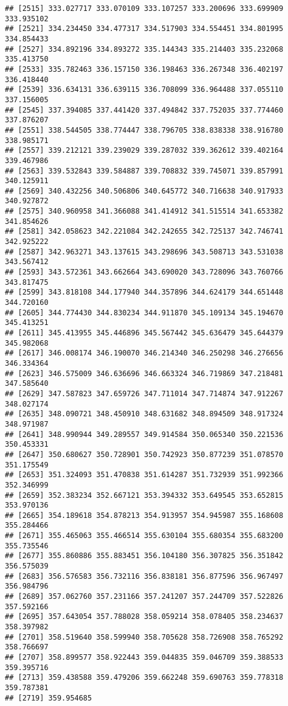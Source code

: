 \documentclass[]{article}
\begin{document}
\begin{verbatim}
## [2515] 333.027717 333.070109 333.107257 333.200696 333.699909 333.935102
## [2521] 334.234450 334.477317 334.517903 334.554451 334.801995 334.854433
## [2527] 334.892196 334.893272 335.144343 335.214403 335.232068 335.413750
## [2533] 335.782463 336.157150 336.198463 336.267348 336.402197 336.418440
## [2539] 336.634131 336.639115 336.708099 336.964488 337.055110 337.156005
## [2545] 337.394085 337.441420 337.494842 337.752035 337.774460 337.876207
## [2551] 338.544505 338.774447 338.796705 338.838338 338.916780 338.985171
## [2557] 339.212121 339.239029 339.287032 339.362612 339.402164 339.467986
## [2563] 339.532843 339.584887 339.708832 339.745071 339.857991 340.125911
## [2569] 340.432256 340.506806 340.645772 340.716638 340.917933 340.927872
## [2575] 340.960958 341.366088 341.414912 341.515514 341.653382 341.854626
## [2581] 342.058623 342.221084 342.242655 342.725137 342.746741 342.925222
## [2587] 342.963271 343.137615 343.298696 343.508713 343.531038 343.567412
## [2593] 343.572361 343.662664 343.690020 343.728096 343.760766 343.817475
## [2599] 343.818108 344.177940 344.357896 344.624179 344.651448 344.720160
## [2605] 344.774430 344.830234 344.911870 345.109134 345.194670 345.413251
## [2611] 345.413955 345.446896 345.567442 345.636479 345.644379 345.982068
## [2617] 346.008174 346.190070 346.214340 346.250298 346.276656 346.334364
## [2623] 346.575009 346.636696 346.663324 346.719869 347.218481 347.585640
## [2629] 347.587823 347.659726 347.711014 347.714874 347.912267 348.027174
## [2635] 348.090721 348.450910 348.631682 348.894509 348.917324 348.971987
## [2641] 348.990944 349.289557 349.914584 350.065340 350.221536 350.453331
## [2647] 350.680627 350.728901 350.742923 350.877239 351.078570 351.175549
## [2653] 351.324093 351.470838 351.614287 351.732939 351.992366 352.346999
## [2659] 352.383234 352.667121 353.394332 353.649545 353.652815 353.970136
## [2665] 354.189618 354.878213 354.913957 354.945987 355.168608 355.284466
## [2671] 355.465063 355.466514 355.630104 355.680354 355.683200 355.735546
## [2677] 355.860886 355.883451 356.104180 356.307825 356.351842 356.575039
## [2683] 356.576583 356.732116 356.838181 356.877596 356.967497 356.984796
## [2689] 357.062760 357.231166 357.241207 357.244709 357.522826 357.592166
## [2695] 357.643054 357.788028 358.059214 358.078405 358.234637 358.397982
## [2701] 358.519640 358.599940 358.705628 358.726908 358.765292 358.766697
## [2707] 358.899577 358.922443 359.044835 359.046709 359.388533 359.395716
## [2713] 359.438588 359.479206 359.662248 359.690763 359.778318 359.787381
## [2719] 359.954685
\end{verbatim}
\end{document}
